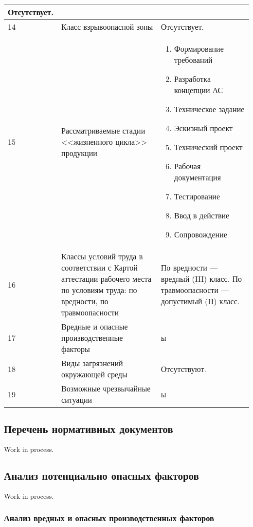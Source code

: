 \begin{footnotesize}
\begin{longtable}[h]{|p{}|p{}|p{}|}
		Отсутствует. \\
	\hline
		14 & 
		Класс взрывоопасной зоны &
		Отсутствует. \\
	\hline
		15 & 
		Рассматриваемые стадии <<жизненного цикла>> продукции &
		\begin{enumerate}
			\item Формирование требований
			\item Разработка концепции АС 
			\item Техническое задание 
			\item Эскизный проект
			\item Технический проект
			\item Рабочая документация
			\item Тестирование
			\item Ввод в действие
			\item Сопровождение
		\end{enumerate} \\
	\hline
		16 & 
		Классы условий труда в соответствии с Картой аттестации рабочего места по условиям труда: \newline
		по вредности, \newline
		по травмоопасности &
		По вредности --- вредный (III) класс. \newline
		По травмоопасности --- допустимый (II) класс. \\
	\hline
		17 & 
		Вредные и опасные производственные факторы &
		ы \\
	\hline
		18 & 
		Виды загрязнений окружающей среды &
		Отсутствуют. \\
	\hline
		19 & 
		Возможные чрезвычайные ситуации &
		ы \\
	\hline
\end{longtable}
\end{footnotesize}

\subsection{Перечень нормативных документов}

Work in process.

\subsection{Анализ потенциально опасных факторов}

Work in process.

\subsubsection{Анализ вредных и опасных производственных факторов}

